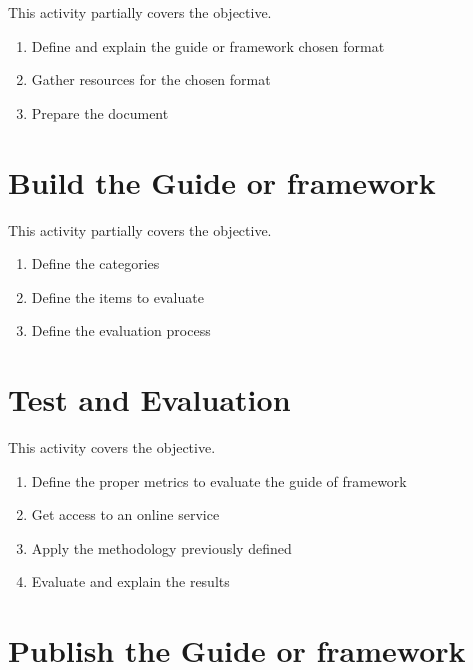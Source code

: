 This activity partially covers the  objective.

\begin{enumerate}
	\item Define and explain the guide or \gls{framework} chosen format
	\item Gather resources for the chosen format
	\item Prepare the document
\end{enumerate}

\newpage

\section{Build the Guide or \Gls{framework}}
\label{sec:activities_build}

This activity partially covers the  objective.

\begin{enumerate}
	\item Define the categories
	\item Define the items to evaluate
	\item Define the evaluation process
\end{enumerate}


\section{Test and Evaluation}
\label{sec:activities_evaluation}

This activity covers the  objective.

\begin{enumerate}
	\item Define the proper metrics to evaluate the guide of \gls{framework}
	\item Get access to an online service
	\item Apply the methodology previously defined
	\item Evaluate and explain the results
\end{enumerate}

\section{Publish the Guide or \Gls{framework}}
\label{sec:activities_publish}

